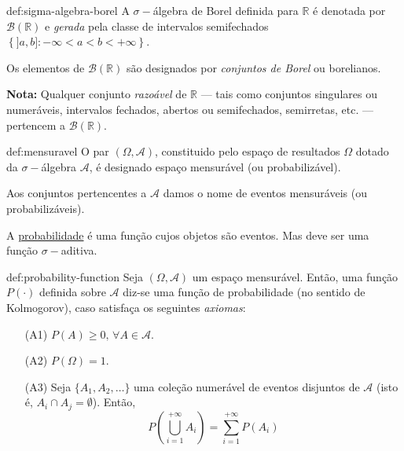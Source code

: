  \begin{theo}{def:sigma-algebra-borel}\label{def:sigma-algebra-borel}
    A $\sigma-$álgebra de Borel definida para $\mathbb{R}$ é denotada por $\mathcal{B}(\mathbb{R})$ e \textit{gerada} pela classe de intervalos semifechados $\left\{ ]a,b]: -\infty < a < b < +\infty \right\}$.

    \noindent Os elementos de $\mathcal{B}(\mathbb{R})$ são designados por \textit{conjuntos de Borel} ou borelianos.

    \vspace{1 em}
    \noindent \textbf{Nota:} Qualquer conjunto \textit{razoável} de $\mathbb{R}$ --- tais como conjuntos singulares ou numeráveis, intervalos fechados, abertos ou semifechados, semirretas, etc. --- pertencem a $\mathcal{B}(\mathbb{R})$.
\end{theo}

\begin{theo}{def:mensuravel}\label{def:mensuravel}
    O par $(\Omega, \mathcal{A})$, constituido pelo espaço de resultados $\Omega$ dotado da $\sigma-$álgebra $\mathcal{A}$, é designado espaço mensurável (ou probabilizável).

    \noindent Aos conjuntos pertencentes a $\mathcal{A}$ damos o nome de eventos mensuráveis (ou probabilizáveis).
\end{theo}

\noindent A \underline{probabilidade} é uma função cujos objetos são eventos. Mas deve ser uma função $\sigma-$aditiva.

\begin{theo}{def:probability-function}\label{def:probability-function}
    Seja $(\Omega, \mathcal{A})$ um espaço mensurável. Então, uma função $P(\cdot)$ definida sobre $\mathcal{A}$ diz-se uma função de probabilidade (no sentido de Kolmogorov), caso satisfaça os seguintes \textit{axiomas}:

    \vspace{-1 em}
    \begin{enumerate}
        \item[(A1)] $P(A) \ge 0,\, \forall A \in \mathcal{A}$.
        \item[(A2)] $P(\Omega) = 1$.
        \item[(A3)] Seja $\{A_1, A_2, \dots\}$ uma coleção numerável de eventos disjuntos de $\mathcal{A}$ (isto é, $A_i \cap A_j = \emptyset$). Então,
        $$
            P\left( \bigcup_{i=1}^{+\infty} A_i \right) = \sum_{i=1}^{+\infty} P(A_i)  
        $$
    \end{enumerate}
\end{theo}

